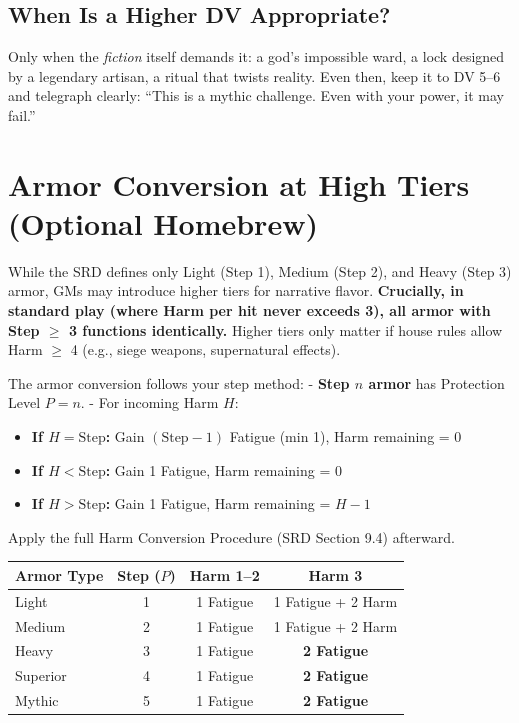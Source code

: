 \subsection*{When Is a Higher DV Appropriate?}
Only when the \emph{fiction} itself demands it: a god's impossible ward, a lock designed by a legendary artisan, a ritual that twists reality. Even then, keep it to DV 5--6 and telegraph clearly: ``This is a mythic challenge. Even with your power, it may fail.''

\section{Armor Conversion at High Tiers (Optional Homebrew)}
\label{sec:armor-epic}
While the SRD defines only Light (Step 1), Medium (Step 2), and Heavy (Step 3) armor, GMs may introduce higher tiers for narrative flavor. \textbf{Crucially, in standard play (where Harm per hit never exceeds 3), all armor with Step $\geq$ 3 functions identically.} Higher tiers only matter if house rules allow Harm $\geq$ 4 (e.g., siege weapons, supernatural effects). 

The armor conversion follows your step method:  
- \textbf{Step $n$ armor} has Protection Level $P = n$.  
- For incoming Harm $H$:  
  \begin{itemize}
    \item \textbf{If $H = \text{Step}$:} Gain $(\text{Step} - 1)$ Fatigue (min 1), Harm remaining = 0  
    \item \textbf{If $H < \text{Step}$:} Gain 1 Fatigue, Harm remaining = 0  
    \item \textbf{If $H > \text{Step}$:} Gain 1 Fatigue, Harm remaining = $H - 1$  
  \end{itemize}  
Apply the full Harm Conversion Procedure (SRD Section 9.4) afterward.  

\begin{center}
\begin{tabularx}{\linewidth}{lccc}
\toprule
\textbf{Armor Type} & \textbf{Step ($P$)} & \textbf{Harm 1--2} & \textbf{Harm 3} \\
\midrule
Light & 1 & 1 Fatigue & 1 Fatigue + 2 Harm \\
Medium & 2 & 1 Fatigue & 1 Fatigue + 2 Harm \\
Heavy & 3 & 1 Fatigue & \textbf{2 Fatigue} \\
Superior & 4 & 1 Fatigue & \textbf{2 Fatigue} \\
Mythic & 5 & 1 Fatigue & \textbf{2 Fatigue} \\
\bottomrule
\end{tabularx}
\end{center}

